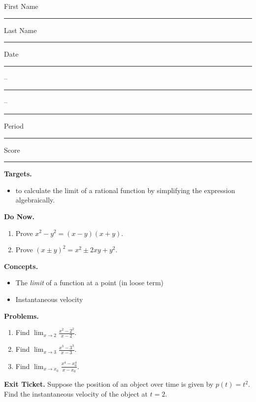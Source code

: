 \documentclass[twoside, 10pt]{article}
\title{}
\date{}
\begin{document}
\noindent
{\large
First Name \rule{6em}{.1pt}Last Name \rule{6em}{.1pt} Date \rule{1.5em}{.1pt} -- \rule{1.5em}{.1pt} -- \rule{1.5em}{.1pt} Period \rule{2em}{.1pt} Score \rule{2em}{.1pt}
}
\vspace{1em}

{\noindent\bf Targets.}
\begin{itemize}
    \item to calculate the limit of a rational function by simplifying the expression algebraically.
\end{itemize}
{\noindent\bf Do Now.}
\begin{enumerate}
\item
Prove \(x^2-y^2 = (x-y)(x+y)\).
\item
Prove \((x \pm y)^2 = x^2 \pm 2xy +y^2\).
\end{enumerate}

{\noindent\bf Concepts.}
\begin{itemize}
\item
The {\it limit} of a function at a point (in loose term)
\item Instantaneous velocity
\end{itemize}
\clearpage

{\noindent\bf Problems.}
\begin{enumerate}
\item
Find $\displaystyle \lim_{x\to2} \frac{x^2 - 2^2}{x-2}$.
\item
Find $\displaystyle \lim_{x\to3} \frac{x^3 - 3^3}{x-3}$.
\item
Find $\displaystyle \lim_{x\to x_0} \frac{x^4 - x_0^4}{x-x_0}$.

\end{enumerate}

{\noindent\bf Exit Ticket.}
Suppose the position of an object over time is given by $p(t) = t^2$. Find the instantaneous velocity of the object at $t=2$. 
\end{document}
